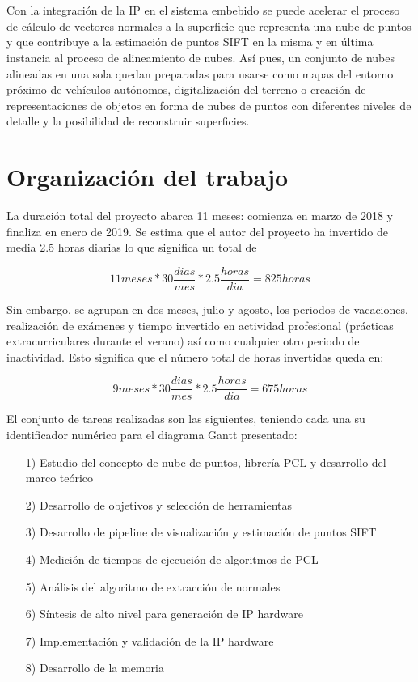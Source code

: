 \\
\\
Con la integración de la IP en el sistema embebido se puede acelerar el proceso de cálculo de vectores normales a la superficie que representa una nube de puntos y que contribuye a la estimación de puntos SIFT en la misma y en última instancia al proceso de alineamiento de nubes. Así pues, un conjunto de nubes alineadas en una sola quedan preparadas para usarse como mapas del entorno próximo de vehículos autónomos, digitalización del terreno o creación de representaciones de objetos en forma de nubes de puntos con diferentes niveles de detalle y la posibilidad de reconstruir superficies.

\section{Organización del trabajo}
La duración total del proyecto abarca 11 meses: comienza en marzo de 2018 y finaliza en enero de 2019. Se estima que el autor del proyecto ha invertido de media 2.5 horas diarias lo que significa un total de 

$$11 meses * 30 \frac{dias}{mes} * 2.5 \frac{horas}{dia} = 825 horas$$

Sin embargo, se agrupan en dos meses, julio y agosto, los periodos de vacaciones, realización de exámenes y tiempo invertido en actividad profesional (prácticas extracurriculares durante el verano) así como cualquier otro periodo de inactividad. Esto significa que el número total de horas invertidas queda en:

$$9 meses * 30 \frac{dias}{mes} * 2.5 \frac{horas}{dia} = 675 horas$$

El conjunto de tareas realizadas son las siguientes, teniendo cada una su identificador numérico para el diagrama Gantt presentado:
\begin{itemize}
\item[1)] Estudio del concepto de nube de puntos, librería PCL y desarrollo del marco teórico
\item[2)] Desarrollo de objetivos y selección de herramientas
\item[3)] Desarrollo de pipeline de visualización y estimación de puntos SIFT
\item[4)] Medición de tiempos de ejecución de algoritmos de PCL
\item[5)] Análisis del algoritmo de extracción de normales
\item[6)] Síntesis de alto nivel para generación de IP hardware
\item[7)] Implementación y validación de la IP hardware
\item[8)] Desarrollo de la memoria
\end{itemize}

